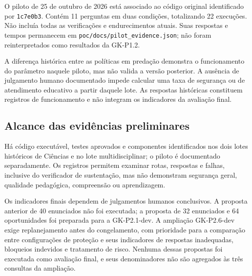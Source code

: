 O piloto de 25 de outubro de 2026 está associado ao código original identificado por \texttt{1c7e0b3}. Contém 11 perguntas em duas condições, totalizando 22 execuções. Não incluía todas as verificações e endurecimentos atuais. Suas respostas e tempos permanecem em \nolinkurl{poc/docs/pilot_evidence.json}; não foram reinterpretados como resultados da GK-P1.2.

A diferença histórica entre as políticas em predação demonstra o funcionamento do parâmetro naquele piloto, mas não valida a versão posterior. A ausência de julgamento humano documentado impede calcular uma taxa de segurança ou de atendimento educativo a partir daquele lote. As respostas históricas constituem registros de funcionamento e não integram os indicadores da avaliação final.

\subsection{Alcance das evidências preliminares}

Há código executável, testes aprovados e componentes identificados nos dois lotes históricos de Ciências e no lote multidisciplinar; o piloto é documentado separadamente. Os registros permitem examinar rotas, respostas e falhas, inclusive do verificador de sustentação, mas não demonstram segurança geral, qualidade pedagógica, compreensão ou aprendizagem.

Os indicadores finais dependem de julgamentos humanos conclusivos. A proposta anterior de 40 enunciados não foi executada; a proposta de 32 enunciados e 64 oportunidades foi preparada para a GK-P2.1-dev. A ampliação GK-P2.6-dev exige replanejamento antes do congelamento, com prioridade para a comparação entre configurações de proteção e seus indicadores de respostas inadequadas, bloqueios indevidos e tratamento de risco. Nenhuma dessas propostas foi executada como avaliação final, e seus denominadores não são agregados às três consultas da ampliação.
